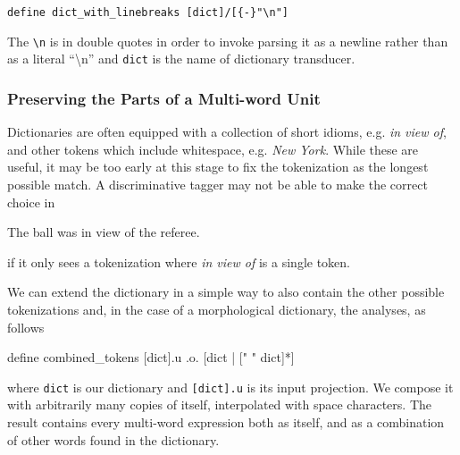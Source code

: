 \documentclass{llncs}
\begin{document}
\begin{center}
  \begin{framed}
\begin{verbatim}
define dict_with_linebreaks [dict]/[{-}"\n"]
\end{verbatim}
  \end{framed}
\end{center}

\noindent The \verb+\n+ is in double quotes in order to invoke parsing it as a newline
rather than as a literal ``\textbackslash n'' and \verb+dict+ is the name of dictionary transducer. 

\subsubsection{Preserving the Parts of a Multi-word Unit}

Dictionaries are often equipped with a collection of short idioms, e.g.\@
\emph{in view of}, and other tokens which include whitespace, e.g.\@
\emph{New York}. While these are useful, it may be too early at this stage
to fix the tokenization as the longest possible match. A discriminative
tagger may not be able to make the correct choice in

\begin{exe}
\item The ball was in view of the referee.
  \label{inview}
\end{exe}

\noindent if it only sees a tokenization where \emph{in view of} is a single token.

We can extend the dictionary in a simple way to also contain the other
possible tokenizations and, in the case of a morphological dictionary,
the analyses, as follows

\begin{center}
\begin{framed}
\begin{verb}
define combined_tokens [dict].u .o. [dict | [" " dict]*]  
\end{verb}
\end{framed}
\end{center}

\noindent where \verb+dict+ is our dictionary and \verb+[dict].u+ is its input
projection. We compose it with arbitrarily many copies of itself,
interpolated with space characters. The result contains every multi-word
expression both as itself, and as a combination of other words found
in the dictionary.
\end{document}
